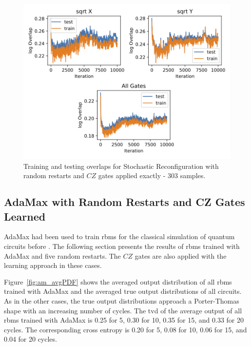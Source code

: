 \begin{figure}[H]
  \centering
  \includegraphics[width=\textwidth]{figures/results/sr-restarts-not-learned/avgOverlap_303.png}
  \caption[Training and Testing Overlaps for Stochastic Reconfiguration with Random Restarts and $CZ$ Gates Applied Exactly - 303 Samples]{
  Training and testing overlaps for Stochastic Reconfiguration with random restarts and $CZ$ gates applied exactly - 303 samples.}
  \label{fig:sr_exact_overlap_303}
\end{figure}

\newpage

\subsection{AdaMax with Random Restarts and CZ Gates Learned}

AdaMax had been used to train \gls{rbm}s for the 
classical simulation of quantum circuits before \cite{jnsson2018neuralnetwork}. The following section presents the results
of \gls{rbm}s trained with AdaMax and five random restarts. The $CZ$ gates are also applied with the 
learning approach in these cases.

Figure~\ref{fig:am_avgPDF} shows the averaged output distribution of all \gls{rbm}s trained with AdaMax and 
the averaged true output distributions of all circuits. As in the other cases, the 
true output distributions approach a Porter-Thomas shape with an increasing number of cycles.
The \gls{tvd} of the average output of all \gls{rbm}s trained with AdaMax
is 0.25 for 5, 0.30 for 10, 0.35 for 15, and 0.33 for 20 cycles. The corresponding cross entropy is 
0.20 for 5, 0.08 for 10, 0.06 for 15, and 0.04 for 20 cycles.

